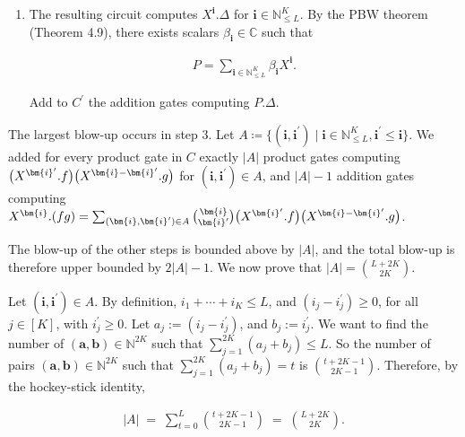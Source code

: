 \documentclass[10pt,a4paper]{article}
\begin{document}
\begin{enumerate}
\item 
 


The resulting circuit computes $X^{\bm{i}}.\Delta$ for ${\bm{i}}\in\mathbb{N}^{K}_{\leq L}$.
By the PBW theorem (Theorem 4.9), there exists scalars $\beta_{\bm{i}}\in\mathbb{C}$ such that



\[\begin{aligned}
\displaystyle P=\sum_{\bm{i}\in\mathbb{N}^{K}_{\leq L}}\beta_{\bm{i}}X^{\bm{i}}.
\end{aligned}\]


Add to $C^{\prime}$ the addition gates computing $P.\Delta$.





\end{enumerate}


The largest blow-up occurs in step 3.
Let $A\coloneqq\{({\bm{i}},{\bm{i}}^{\prime})\mid{\bm{i}}\in\mathbb{N}^{K}_{\leq L},{\bm{i}}^{\prime}\leq{\bm{i}}\}$.
We added for every product gate in $C$ exactly $|A|$ product gates computing $\big{(}X^{{\bm{i}}^{\prime}}.f\big{)}\big{(}X^{{\bm{i}}-{\bm{i}}^{\prime}}.g\big{)}$ for $(\bm{i},\bm{i}^{\prime})\in A$,
and $|A|-1$ addition gates computing $X^{\bm{i}}.(fg)=\sum_{(\bm{i},\bm{i}^{\prime})\in A}\binom{{\bm{i}}}{{\bm{i}}^{\prime}}\big{(}X^{{\bm{i}}^{\prime}}.f\big{)}\big{(}X^{{\bm{i}}-{\bm{i}}^{\prime}}.g\big{)}$.





The blow-up of the other steps is bounded above by $|A|$, and the total blow-up is therefore upper bounded by $2|A|-1$.
We now prove that
$|A|=\binom{L+2K}{2K}$.





Let $(\bm{i},\bm{i}^{\prime})\in A$. By definition, $i_{1}+\cdots+i_{K}\leq L$, and $(i_{j}-i_{j}^{\prime})\geq 0$, for all $j\in[K]$, with $i_{j}^{\prime}\geq 0$. Let $a_{j}:=(i_{j}-i_{j}^{\prime})$, and $b_{j}:=i_{j}^{\prime}$. We want to find the number of $(\bm{a},\bm{b})\in\mathbb{N}^{2K}$ such that $\sum_{j=1}^{2K}(a_{j}+b_{j})\leq L$. So the number of pairs $(\bm{a},\bm{b})\in\mathbb{N}^{2K}$ such that $\sum_{j=1}^{2K}(a_{j}+b_{j})=t$ is $\binom{t+2K-1}{2K-1}$. Therefore, by the hockey-stick identity,



\[\begin{aligned}
|A|\;=\;\sum_{t=0}^{L}\binom{t+2K-1}{2K-1}\;=\;\binom{L+2K}{2K}.
\end{aligned}\]
\end{document}
